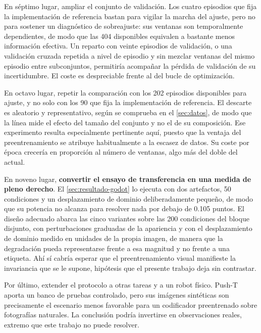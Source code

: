 En s\'eptimo lugar, ampliar el conjunto de validaci\'on. Los cuatro episodios que fija la
implementaci\'on de referencia bastan para vigilar la marcha del ajuste, pero no para
sostener un diagn\'ostico de sobreajuste: sus ventanas son temporalmente dependientes, de
modo que las \num{404} disponibles equivalen a bastante menos informaci\'on efectiva. Un
reparto con veinte episodios de validaci\'on, o una validaci\'on cruzada repetida a nivel
de episodio y sin mezclar ventanas del mismo episodio entre subconjuntos, permitir\'ia
acompa\~nar la p\'erdida de validaci\'on de su incertidumbre. El coste es despreciable
frente al del bucle de optimizaci\'on.

En octavo lugar, repetir la comparaci\'on con los \num{202} episodios disponibles para
ajuste, y no solo con los \num{90} que fija la implementaci\'on de referencia. El descarte
es aleatorio y representativo, seg\'un se comprueba en el \cref{sec:datos}, de modo que la
l\'inea mide el efecto del tama\~no del conjunto y no el de su composici\'on. Ese
experimento resulta especialmente pertinente aqu\'i, puesto que la ventaja del
preentrenamiento se atribuye habitualmente a la escasez de datos. Su coste por \'epoca
crecer\'ia en proporci\'on al n\'umero de ventanas, algo m\'as del doble del actual.

En noveno lugar, \textbf{convertir el ensayo de transferencia en una medida de pleno
derecho}. El \cref{sec:resultado-godot} lo ejecuta con dos artefactos, \num{50} condiciones
y un desplazamiento de dominio deliberadamente peque\~no, de modo que su potencia no alcanza
para resolver nada por debajo de \num{0.105} puntos. El dise\~no adecuado abarca las cinco
variantes sobre las \num{200} condiciones del bloque disjunto, con perturbaciones graduadas
de la apariencia y con el desplazamiento de dominio medido en unidades de la propia imagen,
de manera que la degradaci\'on pueda representarse frente a esa magnitud y no frente a una
etiqueta. Ah\'i s\'i cabr\'ia esperar que el preentrenamiento visual manifieste la
invariancia que se le supone, hip\'otesis que el presente trabajo deja sin contrastar.

Por \'ultimo, extender el protocolo a otras tareas y a un robot f\'isico. Push-T aporta un
banco de pruebas controlado, pero sus im\'agenes sint\'eticas son precisamente el escenario
menos favorable para un codificador preentrenado sobre fotograf\'ias naturales. La
conclusi\'on podr\'ia invertirse en observaciones reales, extremo que este trabajo no puede
resolver.
